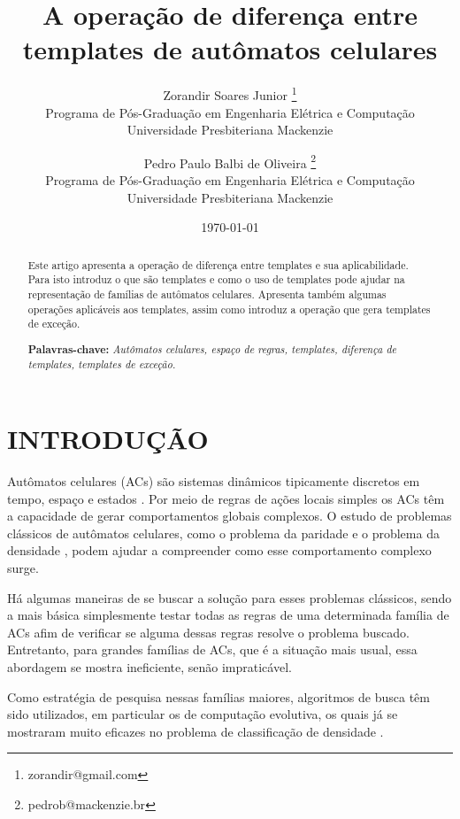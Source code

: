 \documentclass[12pt, a4paper]{article}
\title{A operação de diferença entre templates de autômatos celulares}
\author{Zorandir Soares Junior \footnote{zorandir@gmail.com} \\
 	Programa de Pós-Graduação em Engenharia Elétrica e Computação \\
	Universidade Presbiteriana Mackenzie
	\and
	Pedro Paulo Balbi de Oliveira \footnote{pedrob@mackenzie.br}  \\
 	Programa de Pós-Graduação em Engenharia Elétrica e Computação \\
	Universidade Presbiteriana Mackenzie
	}
\date{\today}
\begin{document}

\pagestyle{plain}
\renewcommand{\baselinestretch}{1.25} 
\normalsize

\maketitle

\begin{abstract}
 Este artigo apresenta a operação de diferença entre templates e sua aplicabilidade. Para isto introduz o que são templates e como o uso de templates pode ajudar na representação de famílias de autômatos celulares. Apresenta também algumas operações aplicáveis aos templates, assim como introduz a operação que gera templates de exceção.

\begin{flushleft}
{\bf Palavras-chave:} {\it Autômatos celulares, espaço de regras, templates, diferença de templates, templates de exceção.}
\end{flushleft}
\end{abstract}

\section{INTRODUÇÃO}
\label{sec:introducao}
Autômatos celulares (ACs) são sistemas dinâmicos tipicamente discretos em tempo, espaço e estados \cite{wolfram2002}. Por meio de regras de ações locais simples os ACs têm a capacidade de gerar comportamentos globais complexos. O estudo de problemas clássicos de autômatos celulares, como o problema da paridade \cite{Betel2013} e o problema da densidade \cite{deOliveira2014density}, podem ajudar a compreender como esse comportamento complexo surge.

Há algumas maneiras de se buscar a solução para esses problemas clássicos, sendo a mais básica simplesmente testar todas as regras de uma determinada família de ACs afim de verificar se alguma dessas regras resolve o problema buscado. Entretanto, para grandes famílias de ACs, que é a situação mais usual, essa abordagem se mostra ineficiente, senão impraticável.

Como estratégia de pesquisa nessas famílias maiores, algoritmos de busca têm sido utilizados, em particular os de computação evolutiva, os quais já se mostraram muito eficazes no problema de classificação de densidade \cite{wolz2008very}.
\end{document}
